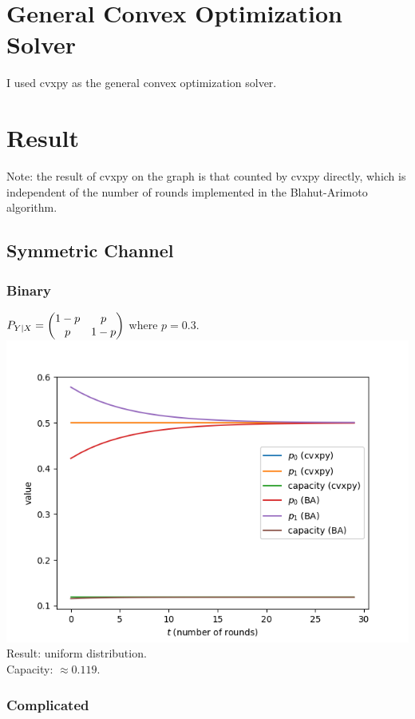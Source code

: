 \section{General Convex Optimization Solver}

I used cvxpy as the general convex optimization solver.

\section{Result}

Note: the result of cvxpy on the graph is that counted by cvxpy directly, which is independent of the number of rounds implemented in the Blahut-Arimoto algorithm.

\subsection{Symmetric Channel}

\subsubsection{Binary}

$P_{Y|X}=\begin{pmatrix}1-p&p\\p&1-p\end{pmatrix}$ where $p=0.3$.\\
\includegraphics[width=15cm]{symmetric.png}\\
Result: uniform distribution.\\
Capacity: $\approx 0.119$.

\subsubsection{Complicated}

